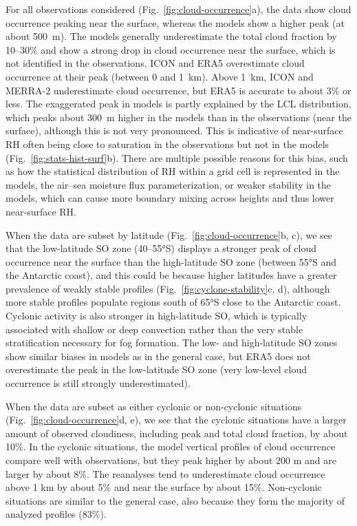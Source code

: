 \documentclass[draft]{agujournal2019}
\begin{document}
For all observations considered (Fig.~\ref{fig:cloud-occurrence}a), the data show cloud occurrence peaking near the surface, whereas the models show a higher peak (at about 500~m). The models generally underestimate the total cloud fraction by 10--30\% and show a strong drop in cloud occurrence near the surface, which is not identified in the observations. ICON and ERA5 overestimate cloud occurrence at their peak (between 0 and 1~km). Above 1~km, ICON and MERRA-2 underestimate cloud occurrence, but ERA5 is accurate to about 3\% or less. The exaggerated peak in models is partly explained by the LCL distribution, which peaks about 300~m higher in the models than in the observations (near the surface), although this is not very pronounced. This is indicative of near-surface RH often being close to saturation in the observations but not in the models (Fig.~\ref{fig:stats-hist-surf}b). There are multiple possible reasons for this bias, such as how the statistical distribution of RH within a grid cell is represented in the models, the air--sea moisture flux parameterization, or weaker stability in the models, which can cause more boundary mixing across heights and thus lower near-surface RH.

When the data are subset by latitude (Fig.~\ref{fig:cloud-occurrence}b, c), we see that the low-latitude SO zone (40--55°S) displays a stronger peak of cloud occurrence near the surface than the high-latitude SO zone (between 55°S and the Antarctic coast), and this could be because higher latitudes have a greater prevalence of weakly stable profiles (Fig.~\ref{fig:cyclone-stability}c, d), although more stable profiles populate regions south of 65°S close to the Antarctic coast. Cyclonic activity is also stronger in high-latitude SO, which is typically associated with shallow or deep convection rather than the very stable stratification necessary for fog formation. The low- and high-latitude SO zones show similar biases in models as in the general case, but ERA5 does not overestimate the peak in the low-latitude SO zone (very low-level cloud occurrence is still strongly underestimated).

When the data are subset as either cyclonic or non-cyclonic situations (Fig.~\ref{fig:cloud-occurrence}d, e), we see that the cyclonic situations have a larger amount of observed cloudiness, including peak and total cloud fraction, by about 10\%. In the cyclonic situations, the model vertical profiles of cloud occurrence compare well with observations, but they peak higher by about 200 m and are larger by about 8\%. The reanalyses tend to underestimate cloud occurrence above 1 km by about 5\% and near the surface by about 15\%. Non-cyclonic situations are similar to the general case, also because they form the majority of analyzed profiles (83\%).
\end{document}
